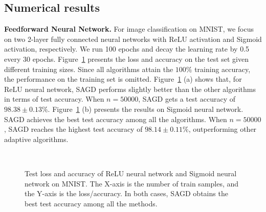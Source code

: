 \documentclass[11pt]{article}
\begin{document}
\subsection{Numerical results}\label{subsec:results}
\vspace{-0.05in}
\textbf{Feedforward Neural Network.}
For image classification on MNIST, we focus on two 2-layer fully connected neural networks with ReLU activation and Sigmoid activation, respectively. We run 100 epochs and decay the learning rate by 0.5 every 30 epochs. 
Figure~\ref{fig:mnist} presents the loss and accuracy on the test set given different training sizes. Since all algorithms attain the $100\%$ training accuracy, the performance on the training set is omitted. 
Figure~\ref{fig:mnist} (a) shows that, for ReLU neural network, 
\textsc{SAGD} performs slightly better than the other algorithms in terms of test accuracy. When $n =50000$, \textsc{SAGD} gets a test accuracy of $98.38 \pm 0.13 \%$. 
Figure~\ref{fig:mnist} (b) presents the results on Sigmoid neural network. \textsc{SAGD} achieves the best test accuracy among all the algorithms. When $n =50000$, \textsc{SAGD} reaches the highest test accuracy of $98.14 \pm 0.11 \%$, outperforming other adaptive algorithms.
\begin{figure}[H]
\mbox{
\hspace{-0.2in}
 }
 \caption[]{Test loss and accuracy of ReLU neural network and Sigmoid neural network on MNIST. The X-axis is the number of train samples, and the Y-axis is the loss/accuracy. In both cases, \textsc{SAGD} obtains the best test accuracy among all the methods.} 
 \label{fig:mnist}
\end{figure}
\end{document}
